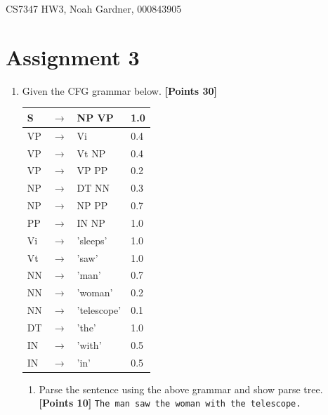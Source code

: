 \documentclass[12pt]{article}
\begin{document}
CS7347 HW3, Noah Gardner, 000843905\newline

\section{Assignment 3}
\begin{enumerate}
    \item Given the CFG grammar below. \textbf{[Points 30]}
          \newline
          \begin{tabular}{lll|l}
              \hline
              S  & $\rightarrow$ & NP VP       & 1.0 \\
              \hline
              VP & $\rightarrow$ & Vi          & 0.4 \\
              VP & $\rightarrow$ & Vt NP       & 0.4 \\
              VP & $\rightarrow$ & VP PP       & 0.2 \\
              \hline
              NP & $\rightarrow$ & DT NN       & 0.3 \\
              NP & $\rightarrow$ & NP PP       & 0.7 \\
              PP & $\rightarrow$ & IN NP       & 1.0 \\
              \hline
              Vi & $\rightarrow$ & 'sleeps'    & 1.0 \\
              Vt & $\rightarrow$ & 'saw'       & 1.0 \\
              NN & $\rightarrow$ & 'man'       & 0.7 \\
              NN & $\rightarrow$ & 'woman'     & 0.2 \\
              NN & $\rightarrow$ & 'telescope' & 0.1 \\
              DT & $\rightarrow$ & 'the'       & 1.0 \\
              IN & $\rightarrow$ & 'with'      & 0.5 \\
              IN & $\rightarrow$ & 'in'        & 0.5 \\
              \hline
          \end{tabular}
          \newline
          \begin{enumerate}
              \item Parse the sentence using the above grammar and show parse tree.
                    \textbf{[Points 10]}
                    \newline
                    \verb/The man saw the woman with the telescope./


\end{enumerate}
\end{enumerate}
\end{document}
